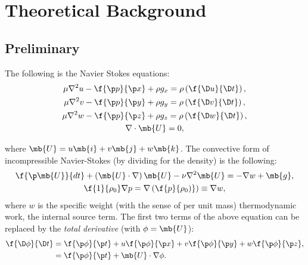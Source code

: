\chapter{Theoretical Background}

\section{Preliminary}

The following is the Navier Stokes equations:
%
\begin{equation}
  \begin{gathered}
    \mu \nabla^2 u - \f{\p p}{\p x} + \rho g_x = \rho \left(\f{\D u}{\D t}\right), \\
    \mu \nabla^2 v - \f{\p p}{\p y} + \rho g_y = \rho \left(\f{\D v}{\D t}\right), \\
    \mu \nabla^2 w - \f{\p p}{\p z} + \rho g_z = \rho \left(\f{\D w}{\D t}\right), \\
    \nabla \cdot \mb{U} = 0,
  \end{gathered}
  \label{eq:navier-stokes}
\end{equation}

%
where \( \mb{U} = u \mb{i} + v \mb{j} + w \mb{k} \). The convective form of incompressible Navier-Stokes (by dividing for the density) is the following:
%
\begin{equation}
  \begin{gathered}
    \f{\p \mb{U}}{dt} + \left( \mb{U} \cdot \nabla \right) \mb{U} - \nu \nabla^2 \mb{U} = -\nabla w + \mb{g}, \\
    \f{1}{\rho_0} \nabla p = \nabla \left(\f{p}{\rho_0)} \right) \equiv \nabla w,
  \end{gathered}
  \label{eq:navier-stokes-compact}
\end{equation}
%
where \(w\) is the specific weight (with the sense of per unit mass) thermodynamic work, the internal source term.
The first two terms of the above equation can be replaced by the \emph{total derivative} (with \(\phi = \mb{U}\)):
%
\begin{equation}
\begin{aligned}
  \f{\D\phi}{\D t} &= \f{\p \phi}{\p t} + u \f{\p\phi}{\p x} + v \f{\p\phi}{\p y} + w \f{\p \phi}{\p z}, \\
               &= \f {\p\phi}{\p t} + \mb{U} \cdot \nabla\phi.
\end{aligned}
\label{eq:total-derivative}
\end{equation}


